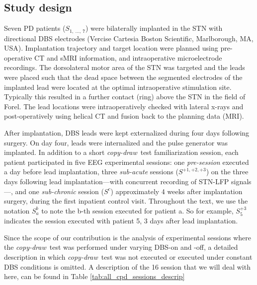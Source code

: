 \documentclass[10pt,a4paper, twocolumn]{article}
\newcommand{\cpd}[0]{\textit{copy-draw}\xspace}
\newcommand{\cpdt}[0]{\textit{copy-draw}~test\xspace}
\newcommand{\patient}[2]{$S_{#1}^{#2}$}
\begin{document}
\subsection{Study design}
Seven PD patients (\patient{1,~\ldots,~7}{}) were bilaterally implanted in the STN with directional DBS electrodes (Vercise Cartesia \texttrademark Boston Scientific, Marlborough, MA, USA). Implantation trajectory and target location were planned using pre-operative CT and sMRI information, and intraoperative microelectrode recordings. The dorsolateral motor area of the STN was targeted and the leads were placed such that the dead space between the segmented electrodes of the implanted lead were located at the optimal intraoperative stimulation site. Typically this resulted in a further contact (ring) above the STN in the field of Forel. The lead locations were intraoperatively checked with lateral x-rays and post-operatively using helical CT and fusion back to the planning data (MRI).

After implantation, DBS leads were kept externalized during four days following surgery. On day four, leads were internalized and the pulse generator was implanted. In addition to a short \cpdt{} familiarization session, each patient participated in five EEG experimental sessions: one \textit{pre-session} executed a day before lead implantation, three \textit{sub-acute} sessions (\patient{}{+1,+2,+3}) on the three days following lead implantation---with concurrent recording of STN-LFP signals---, and one \textit{sub-chronic} session (\patient{}{c}) approximately 4 weeks after implantation surgery, during the first inpatient control visit. Throughout the text, we use the notation \patient{a}{b} to note the b-th session executed for patient a. So for example, \patient{5}{+3} indicates the session executed with patient 5, 3 days after lead implantation.

Since the scope of our contribution is the analysis of experimental sessions where the \cpdt{} was performed under varying DBS-on and -off, a detailed description in which \cpdt{} was not executed or executed under constant DBS conditions is omitted. A description of the 16 session that we will deal with here, can be found in Table \ref{tab:all_cpd_sessions_descrip}
\begin{table}
\resizebox{\textwidth}{!}{
}
\caption{Description of the \cpd~sessions analyzed. Unless otherwise indicated, DBS was performed with a pulse width of 60\,$\mu$s and frequency of 130\,Hz. The STN ipsilateral to the dominant hand was stimulated, when DBS was performed, unless bilateral stimulation was applied, which is indicated. Medication intake times are relative to the experiment start. UPDRS-III scores where obtained---unless otherwise indicated---in medication off, several days prior to the implantation surgery. Tremor (T), Bradykinesia (B), and Rigor (R) scores are given relative to the DBS-off baseline, ranging from 0 (no improvement), to +3 (complete symptom suppression). n/a marks unavailable information.}
\label{tab:all_cpd_sessions_descrip}
\end{table}
\end{document}
